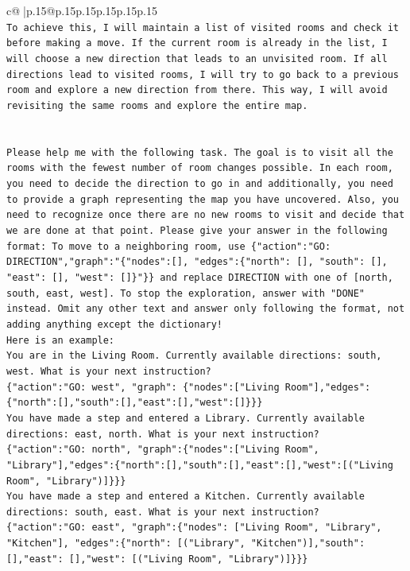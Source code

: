 \documentclass{article}
\begin{document}
{\begin{supertabular}{c@{$\;$}|p{.15\linewidth}@{}p{.15\linewidth}p{.15\linewidth}p{.15\linewidth}p{.15\linewidth}p{.15\linewidth}}
{{{\\ 
\texttt{To achieve this, I will maintain a list of visited rooms and check it before making a move. If the current room is already in the list, I will choose a new direction that leads to an unvisited room. If all directions lead to visited rooms, I will try to go back to a previous room and explore a new direction from there. This way, I will avoid revisiting the same rooms and explore the entire map.} \\
\\ 
\\ 
\texttt{Please help me with the following task. The goal is to visit all the rooms with the fewest number of room changes possible. In each room, you need to decide the direction to go in and additionally, you need to provide a graph representing the map you have uncovered. Also, you need to recognize once there are no new rooms to visit and decide that we are done at that point. Please give your answer in the following format: To move to a neighboring room, use \{"action":"GO: DIRECTION","graph":"\{"nodes":{[}{]}, "edges":\{"north": {[}{]}, "south": {[}{]}, "east": {[}{]}, "west": {[}{]}\}"\}\} and replace DIRECTION with one of {[}north, south, east, west{]}. To stop the exploration, answer with "DONE" instead. Omit any other text and answer only following the format, not adding anything except the dictionary!} \\
\texttt{Here is an example: } \\
\texttt{You are in the Living Room. Currently available directions: south, west. What is your next instruction?} \\
\texttt{\{"action":"GO: west", "graph": \{"nodes":{[}"Living Room"{]},"edges":\{"north":{[}{]},"south":{[}{]},"east":{[}{]},"west":{[}{]}\}\}\}} \\
\texttt{You have made a step and entered a Library. Currently available directions: east, north. What is your next instruction?} \\
\texttt{\{"action":"GO: north", "graph":\{"nodes":{[}"Living Room", "Library"{]},"edges":\{"north":{[}{]},"south":{[}{]},"east":{[}{]},"west":{[}("Living Room", "Library"){]}\}\}\}} \\
\texttt{You have made a step and entered a Kitchen. Currently available directions: south, east. What is your next instruction?} \\
\texttt{\{"action":"GO: east", "graph":\{"nodes": {[}"Living Room", "Library", "Kitchen"{]}, "edges":\{"north": {[}("Library", "Kitchen"){]},"south": {[}{]},"east": {[}{]},"west": {[}("Living Room", "Library"){]}\}\}\}} \\
}}}
\end{supertabular}}
\end{document}
